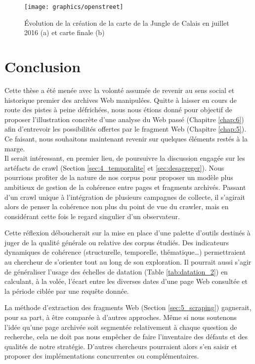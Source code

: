 \documentclass[symmetric,justified,marginals=raggedouter]{tufte-book}
\begin{document}
\begin{figure*}%
  \texttt{[image: graphics/openstreet]}
  \caption{Évolution de la création de la carte de la Jungle de Calais en juillet 2016 (a) et carte finale (b)}
  \label{fig:openstreet}
\end{figure*}     



\chapter*{Conclusion}

\noindent Cette thèse a été menée avec la volonté assumée de revenir au sens social et historique premier des archives Web manipulées. Quitte à laisser en cours de route des pistes à peine défrichées, nous nous étions donné pour objectif de proposer l'illustration concrète d'une analyse du Web passé (Chapitre \ref{chap:6}) afin d'entrevoir les possibilités offertes par le fragment Web (Chapitre \ref{chap:5}). Ce faisant, nous souhaitons maintenant revenir  sur quelques éléments restés à la marge.\\ 

\noindent Il serait intéressant, en premier lieu, de poursuivre la discussion engagée sur les artéfacts de crawl (Section \ref{sec:4_temporalite} et \ref{sec:desagreger}). Nous pourrions profiter de la nature de nos corpus pour proposer un modèle plus ambitieux de gestion de la cohérence entre pages et fragments archivés. Passant d'un crawl unique à l'intégration de plusieurs campagnes de collecte, il s'agirait alors de penser la cohérence non plus du point de vue du crawler, mais en considérant cette fois le regard singulier d'un observateur.

Cette réflexion déboucherait sur la mise en place d'une palette d'outils destinés à juger de la qualité générale ou relative des corpus étudiés. Des indicateurs dynamiques de cohérence (structurelle, temporelle, thématique\ldots{}) permettraient au chercheur de s'orienter tout au long de son exploration. Il pourrait aussi s'agir de généraliser l'usage des échelles de datation (Table \ref{tab:datation_2}) en calculant, à la volée, l'écart entre les diverses dates d'une page Web consultée et la période ciblée par une requête donnée.

La méthode d'extraction des fragments Web (Section \ref{sec:5_scraping}) gagnerait, pour sa part, à être comparée à d'autres approches. Même si nous soutenons l'idée qu'une page archivée soit segmentée relativement à chaque question de recherche, cela ne doit pas nous empêcher de faire l'inventaire des défauts et des qualités de notre stratégie. D'autres chercheurs pourraient alors s'en saisir et proposer des implémentations concurrentes ou complémentaires.  
\end{document}
